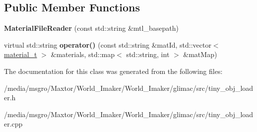 \subsection*{Public Member Functions}
\begin{DoxyCompactItemize}
\item 
\mbox{\label{classtinyobj_1_1MaterialFileReader_a824d0100284310fe213d86ad443cc575}} 
{\bfseries Material\+File\+Reader} (const std\+::string \&mtl\+\_\+basepath)
\item 
\mbox{\label{classtinyobj_1_1MaterialFileReader_a9374212c9997aa8ac0d15d97f67b25f8}} 
virtual std\+::string {\bfseries operator()} (const std\+::string \&mat\+Id, std\+::vector$<$ \hyperlink{structtinyobj_1_1material__t}{material\+\_\+t} $>$ \&materials, std\+::map$<$ std\+::string, int $>$ \&mat\+Map)
\end{DoxyCompactItemize}


The documentation for this class was generated from the following files\+:\begin{DoxyCompactItemize}
\item 
/media/msgro/\+Maxtor/\+World\+\_\+\+Imaker/\+World\+\_\+\+Imaker/glimac/src/tiny\+\_\+obj\+\_\+loader.\+h\item 
/media/msgro/\+Maxtor/\+World\+\_\+\+Imaker/\+World\+\_\+\+Imaker/glimac/src/tiny\+\_\+obj\+\_\+loader.\+cpp\end{DoxyCompactItemize}
